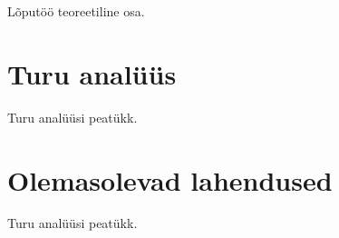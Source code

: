 Lõputöö teoreetiline osa.
\section{Turu analüüs}
Turu analüüsi peatükk.

\section{Olemasolevad lahendused}
Turu analüüsi peatükk.

